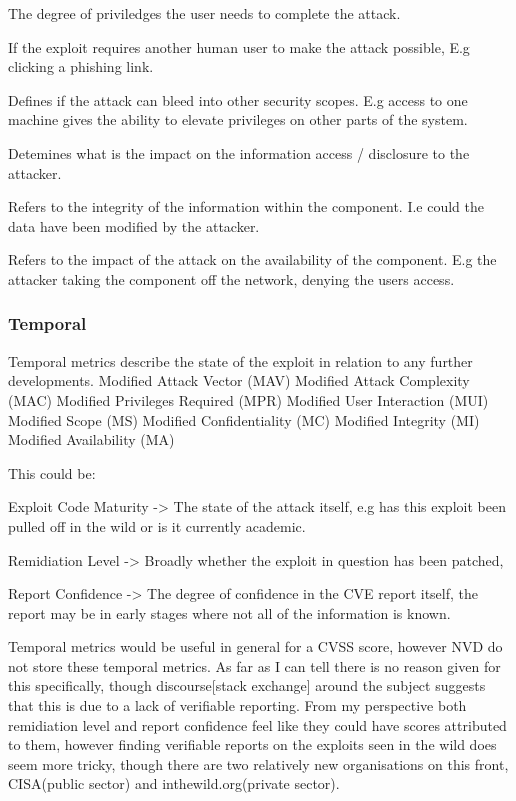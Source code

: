 \documentclass[11pt]{article}
\begin{document}
The degree of priviledges the user needs to complete the attack.

If the exploit requires another human user to make the attack possible, E.g clicking a phishing link.

Defines if the attack can bleed into other security scopes. E.g access to one machine gives the ability to elevate privileges on other parts of the system.

Detemines what is the impact on the information access / disclosure to the attacker.

Refers to the integrity of the information within the component. I.e could the data have been modified by the attacker.

Refers to the impact of the attack on the availability of the component. E.g the attacker taking the component off the network, denying the users access.
\subsubsection*{Temporal}

Temporal metrics describe the state of the exploit in relation to any further developments.
Modified Attack Vector (MAV)
Modified Attack Complexity (MAC)
Modified Privileges Required (MPR)
Modified User Interaction (MUI)
Modified Scope (MS)
Modified Confidentiality (MC)
Modified Integrity (MI)
Modified Availability (MA)
\bigskip

This could be:
\begin{itemize}

	Exploit Code Maturity -> The state of the attack itself, e.g has this exploit been pulled off in the wild or is it currently academic.

	Remidiation Level -> Broadly whether the exploit in question has been patched,

	Report Confidence -> The degree of confidence in the CVE report itself, the report may be in early stages where not all of the
	information is known.

\end{itemize}

Temporal metrics would be useful in general for a CVSS score, however NVD do not store these temporal metrics. As far as
I can tell there is no reason given for this specifically, though discourse[stack exchange] around the subject suggests that this is due
to a lack of verifiable reporting. From my perspective both remidiation level and report confidence feel like they could
have scores attributed to them, however finding verifiable reports on the exploits seen in the wild does seem more
tricky, though there are two relatively new organisations on this front, CISA(public sector) and inthewild.org(private
sector).
\end{document}
